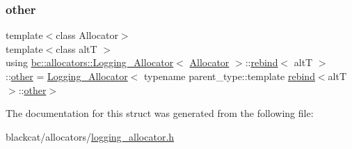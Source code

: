 \subsubsection{\texorpdfstring{other}{other}}
{\footnotesize\ttfamily template$<$class Allocator$>$ \\
template$<$class altT $>$ \\
using \hyperlink{structbc_1_1allocators_1_1Logging__Allocator}{bc\+::allocators\+::\+Logging\+\_\+\+Allocator}$<$ \hyperlink{classbc_1_1allocators_1_1Allocator}{Allocator} $>$\+::\hyperlink{structbc_1_1allocators_1_1Logging__Allocator_1_1rebind}{rebind}$<$ altT $>$\+::\hyperlink{structbc_1_1allocators_1_1Logging__Allocator_1_1rebind_ad2959439fcb1aa3d20874f1f3a205828}{other} =  \hyperlink{structbc_1_1allocators_1_1Logging__Allocator}{Logging\+\_\+\+Allocator}$<$ typename parent\+\_\+type\+::template \hyperlink{structbc_1_1allocators_1_1Logging__Allocator_1_1rebind}{rebind}$<$altT$>$\+::\hyperlink{structbc_1_1allocators_1_1Logging__Allocator_1_1rebind_ad2959439fcb1aa3d20874f1f3a205828}{other}$>$}



The documentation for this struct was generated from the following file\+:\begin{DoxyCompactItemize}
\item 
blackcat/allocators/\hyperlink{logging__allocator_8h}{logging\+\_\+allocator.\+h}\end{DoxyCompactItemize}
